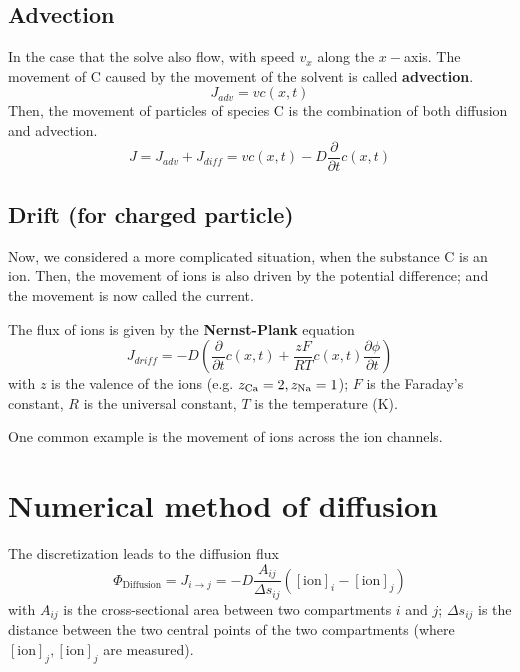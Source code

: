 \subsection{Advection}
\label{sec:advection}

In the case that the solve also flow, with speed $v_x$ along the
$x-$axis. The movement of C caused by the movement of the solvent is
called {\bf advection}. 
\begin{equation}
  \label{eq:806}
  J_{adv} = vc(x,t)
\end{equation}
Then, the movement of particles of species C is the combination of
both diffusion and advection.
\begin{equation}
  \label{eq:807}
  J = J_{adv} + J_{diff} = vc(x,t) - D\frac{\partial}{\partial t} c(x,t)
\end{equation}


\subsection{Drift (for charged particle)}
\label{sec:drift-for-charged}

Now, we considered a more complicated situation, when the substance C
is an ion. Then, the movement of ions is also driven by the potential
difference; and the movement is now called the current.

The flux of ions is given by the {\bf Nernst-Plank} equation
\begin{equation}
  \label{eq:808}
  J_{driff} = -D \left( \frac{\partial}{\partial t}c(x,t) +
    \frac{zF}{RT}c(x,t) \frac{\partial \phi}{\partial t} \right)
\end{equation}
with $z$ is the valence of the ions (e.g. $z_{\ce{Ca}}=2, z_{\ce{Na}}=1$);
$F$ is the Faraday's constant, $R$ is the universal constant, $T$ is the
temperature (K).

One common example is the movement of ions across the ion channels. 

\section{Numerical method of diffusion}

The discretization leads to the diffusion flux
\def\ion{{\text{ion}}}
\def\Dif{{\text{Diffusion}}}
\begin{equation}
\Phi_\Dif = J_{i\rightarrow j} = - D \frac{A_{ij}}{\Delta s_{ij}} \left(
[\ion]_i - [\ion]_j\right)
\end{equation}
with $A_{ij}$ is the cross-sectional area between two compartments $i$ and $j$;
$\Delta s_{ij}$ is the distance between the two central points of the two
compartments (where $[\ion]_j, [\ion]_j$ are measured).

